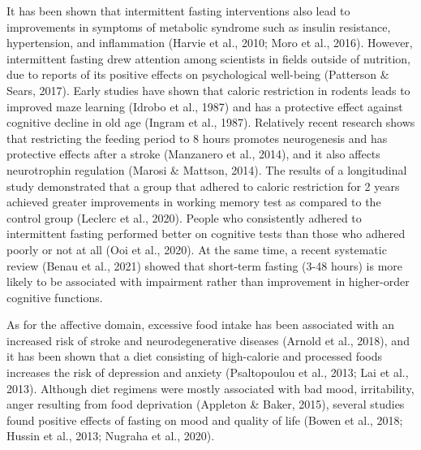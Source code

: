 \documentclass[authordate, empirical]{jote-new-article}
\begin{document}
It has been shown that intermittent fasting interventions also lead to improvements in symptoms of metabolic syndrome such as insulin resistance, hypertension, and inflammation (Harvie et al., 2010; Moro et al., 2016). However, intermittent fasting drew attention among scientists in fields outside of nutrition, due to reports of its positive effects on psychological well-being (Patterson \& Sears, 2017). Early studies have shown that caloric restriction in rodents leads to improved maze learning (Idrobo et al., 1987) and has a protective effect against cognitive decline in old age (Ingram et al., 1987). Relatively recent research shows that restricting the feeding period to 8 hours promotes neurogenesis and has protective effects after a stroke (Manzanero et al., 2014), and it also affects neurotrophin regulation (Marosi \& Mattson, 2014). The results of a longitudinal study demonstrated that a group that adhered to caloric restriction for 2 years achieved greater improvements in working memory test as compared to the control group (Leclerc et al., 2020). People who consistently adhered to intermittent fasting performed better on cognitive tests than those who adhered poorly or not at all (Ooi et al., 2020). At the same time, a recent systematic review (Benau et al., 2021) showed that short-term fasting (3-48 hours) is more likely to be associated with impairment rather than improvement in higher-order cognitive functions.



As for the affective domain, excessive food intake has been associated with an increased risk of stroke and neurodegenerative diseases (Arnold et al., 2018), and it has been shown that a diet consisting of high-calorie and processed foods increases the risk of depression and anxiety (Psaltopoulou et al., 2013; Lai et al., 2013). Although diet regimens were mostly associated with bad mood, irritability, anger resulting from food deprivation (Appleton \& Baker, 2015), several studies found positive effects of fasting on mood and quality of life (Bowen et al., 2018; Hussin et al., 2013; Nugraha et al., 2020).
\end{document}
